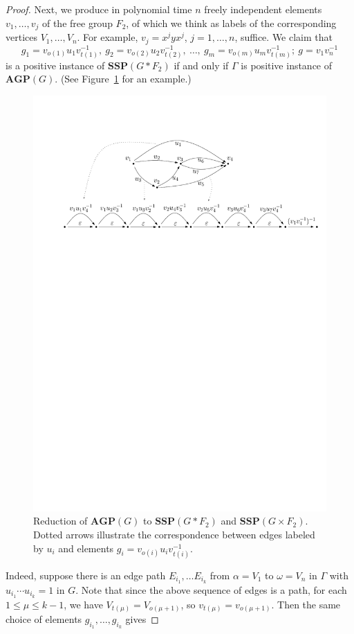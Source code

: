 \documentclass[10pt]{amsart}
\theoremstyle{definition}
\def\SSP{{\mathbf{SSP}}}
\def\AGP{{\mathbf{AGP}}}
\begin{document}
\begin{proof}
Next, we produce in polynomial time $n$ freely independent elements $v_1,\ldots, v_j$ of the free group $F_2$, of which we think as labels of the corresponding vertices $V_1,\ldots, V_n$. For example, $v_j=x^jyx^j$, $j=1,\ldots,n$, suffice.
We claim that
$$g_1 = v_{o(1)}u_1v_{t(1)}^{-1},\ g_2=v_{o(2)}u_2v_{t(2)}^{-1},\ \ldots,\ g_m=v_{o(m)}u_mv_{t(m)}^{-1};\ g=v_{1}v_{n}^{-1}
$$
is a positive instance of $\SSP(G\ast F_2)$ if and only if $\Gamma$ is positive instance of $\AGP(G)$. (See Figure~\ref{fi:agp_to_ssp} for an example.)
\begin{figure}[h]
 \centering
 \includegraphics[width=4.5in]{agp_to_ssp}
 \caption{Reduction of $\AGP(G)$ to $\SSP(G\ast F_2)$ and $\SSP(G\times F_2)$. Dotted arrows illustrate the correspondence between edges labeled by $u_i$ and elements $g_i=v_{o(i)}u_iv_{t(i)}^{-1}$.}\label{fi:agp_to_ssp}
\end{figure}
Indeed, suppose there is an edge path $E_{i_1}, \ldots E_{i_k}$ from $\alpha=V_1$ to $\omega=V_n$ in $\Gamma$ with $u_{i_1}\cdots u_{i_k}=1$ in $G$. Note that since the above sequence of edges is a path, for each $1\le \mu\le k-1$, we have $V_{t(\mu)}=V_{o(\mu+1)}$, so $v_{t(\mu)}=v_{o(\mu+1)}$. Then the same choice of elements $g_{i_1},\ldots, g_{i_k}$ gives

\end{proof}
\end{document}
